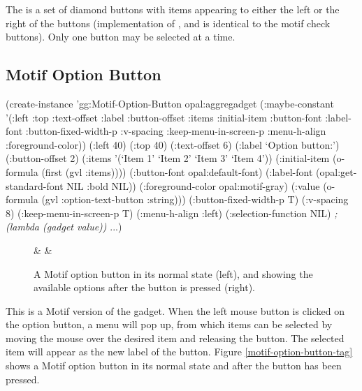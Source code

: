 The  is a set of diamond buttons with items
appearing to either the left or the right of the buttons (implementation
of ,  and  is identical
to the motif check buttons).  Only one button may be selected at a time.



\begin{group}
\section{Motif Option Button}
\label{motif-option-button}

\begin{programexample}
(create-instance 'gg:Motif-Option-Button opal:aggregadget
  (:maybe-constant '(:left :top :text-offset :label :button-offset :items :initial-item
                     :button-font :label-font :button-fixed-width-p :v-spacing
                     :keep-menu-in-screen-p :menu-h-align :foreground-color))
  (:left 40) (:top 40)
  (:text-offset 6)
  (:label `Option button:')
  (:button-offset 2)
  (:items '(`Item 1' `Item 2' `Item 3' `Item 4'))
  (:initial-item (o-formula (first (gvl :items))))
  (:button-font opal:default-font)
  (:label-font (opal:get-standard-font NIL :bold NIL))
  (:foreground-color opal:motif-gray)
  (:value (o-formula (gvl :option-text-button :string)))
  (:button-fixed-width-p T)
  (:v-spacing 8)
  (:keep-menu-in-screen-p T)
  (:menu-h-align :left)
  (:selection-function NIL)   {\it ; (lambda (gadget value))}
  ...)
\end{programexample}
\end{group}

\tabclear
{}
\begin{figure}
 &  & 
\caption{A Motif option button in its normal state (left), and showing the
available options after the button is pressed (right).}
\end{figure}


This is a Motif version of the  gadget.
When the left mouse button is clicked
on the option button, a menu will pop up, from which items can be
selected by moving the mouse over the desired item and releasing the
button.  The selected item will appear as the new label of the button.
Figure \ref{motif-option-button-tag} shows a Motif option button in its normal
state and after the button has been pressed.

